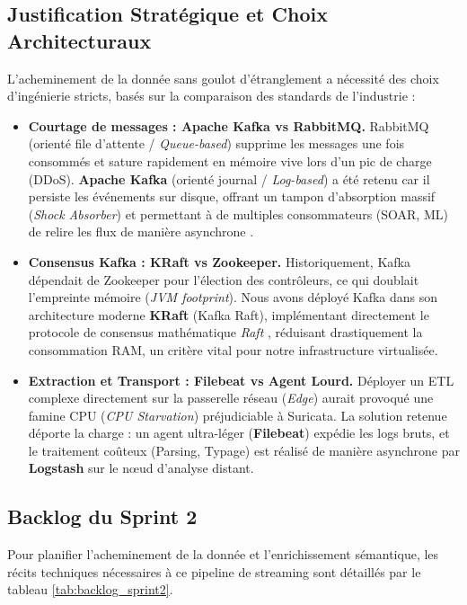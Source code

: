 \subsection{Justification Stratégique et Choix Architecturaux}
L'acheminement de la donnée sans goulot d'étranglement a nécessité des choix d'ingénierie stricts, basés sur la comparaison des standards de l'industrie :
\begin{itemize}
    \item \textbf{Courtage de messages : Apache Kafka vs RabbitMQ.} RabbitMQ (orienté file d'attente / \textit{Queue-based}) supprime les messages une fois consommés et sature rapidement en mémoire vive lors d'un pic de charge (DDoS). \textbf{Apache Kafka} (orienté journal / \textit{Log-based}) a été retenu car il persiste les événements sur disque, offrant un tampon d'absorption massif (\textit{Shock Absorber}) et permettant à de multiples consommateurs (SOAR, ML) de relire les flux de manière asynchrone \cite{kreps2011kafka}.
    \item \textbf{Consensus Kafka : KRaft vs Zookeeper.} Historiquement, Kafka dépendait de Zookeeper pour l'élection des contrôleurs, ce qui doublait l'empreinte mémoire (\textit{JVM footprint}). Nous avons déployé Kafka dans son architecture moderne \textbf{KRaft} (Kafka Raft), implémentant directement le protocole de consensus mathématique \textit{Raft} \cite{ongaro2014search}, réduisant drastiquement la consommation RAM, un critère vital pour notre infrastructure virtualisée.
    \item \textbf{Extraction et Transport : Filebeat vs Agent Lourd.} Déployer un ETL complexe directement sur la passerelle réseau (\textit{Edge}) aurait provoqué une famine CPU (\textit{CPU Starvation}) préjudiciable à Suricata. La solution retenue déporte la charge : un agent ultra-léger (\textbf{Filebeat}) expédie les logs bruts, et le traitement coûteux (Parsing, Typage) est réalisé de manière asynchrone par \textbf{Logstash} sur le nœud d'analyse distant.
\end{itemize}

\subsection{Backlog du Sprint 2}
Pour planifier l'acheminement de la donnée et l'enrichissement sémantique, les récits techniques nécessaires à ce pipeline de streaming sont détaillés par le tableau \ref{tab:backlog_sprint2}.

